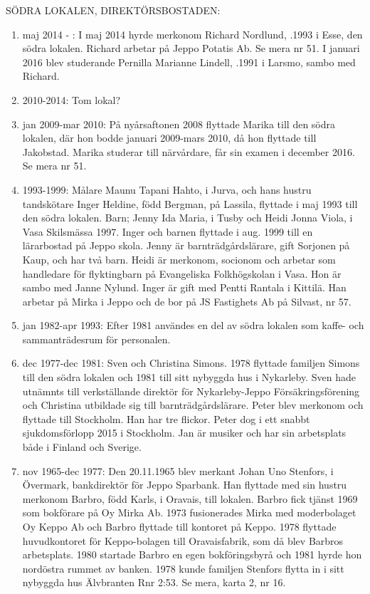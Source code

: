 
SÖDRA LOKALEN, DIREKTÖRSBOSTADEN:
\begin{enumerate}
  \item 	maj 2014 -   : I maj 2014 hyrde merkonom Richard Nordlund, .1993 i Esse, den södra lokalen. Richard arbetar på Jeppo Potatis Ab. Se mera nr 51. I januari 2016 blev studerande Pernilla Marianne Lindell, .1991 i Larsmo, sambo med Richard.
  \item 2010-2014: Tom lokal?
  \item jan 2009-mar 2010: På nyårsaftonen 2008 flyttade Marika till den södra lokalen, där hon bodde januari 2009-mars 2010, då hon flyttade till Jakobstad. Marika studerar till närvårdare, får sin examen i december 2016. Se mera nr 51.
  \item 1993-1999: Målare Maunu Tapani Hahto,  i Jurva, och hans hustru tandskötare Inger Heldine, född Bergman,  på Lassila, flyttade i maj 1993 till den södra lokalen.
  Barn;	Jenny Ida Maria,	 i Tusby och	Heidi Jonna Viola,	 i Vasa
  Skilsmässa 1997. Inger och barnen flyttade i aug. 1999 till en lärarbostad på Jeppo skola. Jenny är barnträdgårdslärare, gift Sorjonen på Kaup, och har två barn. Heidi är merkonom, socionom och arbetar som handledare för flyktingbarn på Evangeliska Folkhögskolan i Vasa. Hon är sambo med Janne Nylund. Inger är gift med Pentti Rantala  i Kittilä. Han arbetar på Mirka i Jeppo och de bor på JS Fastighets Ab på Silvast, nr 57.
  \item jan 1982-apr 1993: Efter 1981 användes en del av södra lokalen som kaffe- och sammanträdesrum för personalen.
  \item dec 1977-dec 1981: Sven och Christina Simons. 1978 flyttade familjen Simons till den södra lokalen och 1981 till sitt nybyggda hus i Nykarleby. Sven hade utnämnts till verkställande direktör för Nykarleby-Jeppo Försäkringsförening och Christina utbildade sig till barnträdgårdslärare. Peter blev merkonom och flyttade till Stockholm. Han har tre flickor. Peter dog i ett snabbt sjukdomsförlopp 2015 i Stockholm. Jan är musiker och har sin arbetsplats både i Finland och Sverige.
  \item nov 1965-dec 1977: 	Den 20.11.1965 blev merkant Johan Uno Stenfors,  i Övermark, bankdirektör för Jeppo Sparbank. Han flyttade med sin hustru merkonom Barbro, född Karls,  i Oravais, till lokalen. Barbro fick tjänst 1969 som bokförare på Oy Mirka Ab. 1973 fusionerades Mirka med moderbolaget Oy Keppo Ab och Barbro flyttade till kontoret på Keppo. 1978 flyttade huvudkontoret för Keppo-bolagen till Oravaisfabrik, som då blev Barbros arbetsplats. 1980 startade Barbro en egen bokföringsbyrå och 1981 hyrde hon nordöstra rummet av banken. 1978 kunde familjen Stenfors flytta in i sitt nybyggda hus Älvbranten Rnr 2:53. Se mera, karta 2, nr 16.

\end{enumerate}
